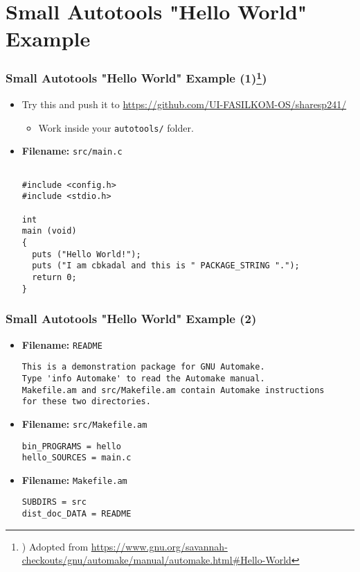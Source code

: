 \documentclass[aspectratio=169, xcolor=table, notheorems, hyperref={pdfpagelabels=false}]{beamer}
\begin{document}
\section{Small Autotools "Hello World" Example}
\begin{frame}[fragile]
\frametitle{Small Autotools "Hello World" Example (1)\footnote{%
) Adopted from {\tiny \url{https://www.gnu.org/savannah-checkouts/gnu/automake/manual/automake.html\#Hello-World}}%
})}

\begin{itemize}
\item Try this and push it to \url{https://github.com/UI-FASILKOM-OS/sharesp241/}
\begin{itemize}
\item Work inside your \texttt{autotools/} folder.
\end{itemize}

\item \textbf{Filename:} \texttt{src/main.c}
\begin{lstlisting}[basicstyle=\ttfamily\small]

#include <config.h>
#include <stdio.h>

int
main (void)
{
  puts ("Hello World!");
  puts ("I am cbkadal and this is " PACKAGE_STRING ".");
  return 0;
}

\end{lstlisting}
\end{itemize}

\end{frame}

\begin{frame}[fragile]
\frametitle{Small Autotools "Hello World" Example (2)}

\begin{itemize}
\item \textbf{Filename:} \texttt{README}
\begin{lstlisting}[basicstyle=\ttfamily\small]
This is a demonstration package for GNU Automake.
Type 'info Automake' to read the Automake manual.
Makefile.am and src/Makefile.am contain Automake instructions 
for these two directories.
\end{lstlisting}

\item \textbf{Filename:} \texttt{src/Makefile.am}
\begin{lstlisting}[basicstyle=\ttfamily\small]
bin_PROGRAMS = hello
hello_SOURCES = main.c
\end{lstlisting}

\item \textbf{Filename:} \texttt{Makefile.am}
\begin{lstlisting}[basicstyle=\ttfamily\small]
SUBDIRS = src
dist_doc_DATA = README

\end{lstlisting}
\end{itemize}

\end{frame}
\end{document}
